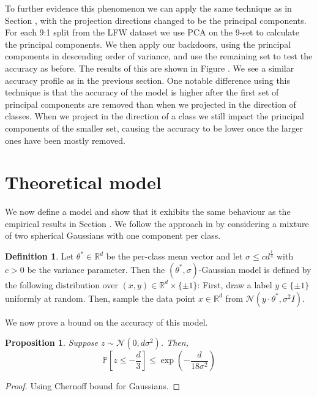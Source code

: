 \documentclass{article}
\theoremstyle{plain}
\newtheorem{proposition}[theorem]{Proposition}
\theoremstyle{definition}
\newtheorem{definition}[theorem]{Definition}
\theoremstyle{remark}
\begin{document}
To further evidence this phenomenon we can apply the same technique as in Section , with the projection directions changed to be the principal components. For each 9:1 split from the LFW dataset we use PCA on the 9-set to calculate the principal components. We then apply our backdoors, using the principal components in descending order of variance, and use the remaining set to test the accuracy as before. The results of this are shown in Figure \todo{}. We see a similar accuracy profile as in the previous section. One notable difference using this technique is that the accuracy of the model is higher after the first set of principal components are removed than when we projected in the direction of classes. When we project in the direction of a class we still impact the principal components of the smaller set, causing the accuracy to be lower once the larger ones have been mostly removed.

\section{Theoretical model}
\label{Theoretical model}
We now define a model and show that it exhibits the same behaviour as the empirical results in Section . We follow the approach in  by considering a mixture of two spherical Gaussians with one component per class.

\begin{definition}
    \label{def:gaussian-model}
    Let \( \theta^{*}\in\mathbb{R}^d \) be the per-class mean vector and let \( \sigma \leq cd^{\frac{1}{4}} \) with \( c>0 \) be the variance parameter. Then the \( (\theta^*, \sigma) \)-Gaussian model is defined by the following distribution over \( (x,y)\in\mathbb{R}^d\times\{\pm1\} \): First, draw a label \( y\in\{\pm1\} \) uniformly at random. Then, sample the data point \( x\in\mathbb{R}^d \) from \( \mathcal{N}(y\cdot\theta^*, \sigma^2I) \).
\end{definition}

We now prove a bound on the accuracy of this model.

\begin{proposition}
    Suppose \( z\sim\mathcal{N}(0, d\sigma^2) \). Then,
    \begin{equation}
        \mathbb{P}\left[z\leq -\frac{d}{3}\right] \leq \exp\left(-\frac{d}{18\sigma^2}\right)
    \end{equation}
\end{proposition}
\begin{proof}
    Using Chernoff bound for Gaussians.
\end{proof}
\end{document}

